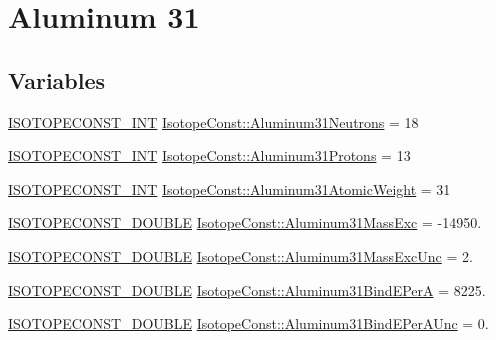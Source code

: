\hypertarget{group___isotope_const-_aluminum-_al31}{}\section{Aluminum 31}
\label{group___isotope_const-_aluminum-_al31}
\subsection*{Variables}
\begin{DoxyCompactItemize}
\item 
\mbox{\hyperlink{group___isotope_const-_macros_ga5f18360b3e99483a35c32d789e62621c}{I\+S\+O\+T\+O\+P\+E\+C\+O\+N\+S\+T\+\_\+\+I\+NT}} \mbox{\hyperlink{group___isotope_const-_aluminum-_al31_ga6e9962d73f31a67100a8aa404f2e4ec9}{Isotope\+Const\+::\+Aluminum31\+Neutrons}} = 18
\item 
\mbox{\hyperlink{group___isotope_const-_macros_ga5f18360b3e99483a35c32d789e62621c}{I\+S\+O\+T\+O\+P\+E\+C\+O\+N\+S\+T\+\_\+\+I\+NT}} \mbox{\hyperlink{group___isotope_const-_aluminum-_al31_ga1ed0e505b7250fbfa53df87f36fa4ebe}{Isotope\+Const\+::\+Aluminum31\+Protons}} = 13
\item 
\mbox{\hyperlink{group___isotope_const-_macros_ga5f18360b3e99483a35c32d789e62621c}{I\+S\+O\+T\+O\+P\+E\+C\+O\+N\+S\+T\+\_\+\+I\+NT}} \mbox{\hyperlink{group___isotope_const-_aluminum-_al31_gab3f313e096d24d246644c6d74b49bdf8}{Isotope\+Const\+::\+Aluminum31\+Atomic\+Weight}} = 31
\item 
\mbox{\hyperlink{group___isotope_const-_macros_ga8f45a7272ce02c0b4c65c44636ed719a}{I\+S\+O\+T\+O\+P\+E\+C\+O\+N\+S\+T\+\_\+\+D\+O\+U\+B\+LE}} \mbox{\hyperlink{group___isotope_const-_aluminum-_al31_ga7560511e2f5bba60ffecc9b698e2791d}{Isotope\+Const\+::\+Aluminum31\+Mass\+Exc}} = -\/14950.
\item 
\mbox{\hyperlink{group___isotope_const-_macros_ga8f45a7272ce02c0b4c65c44636ed719a}{I\+S\+O\+T\+O\+P\+E\+C\+O\+N\+S\+T\+\_\+\+D\+O\+U\+B\+LE}} \mbox{\hyperlink{group___isotope_const-_aluminum-_al31_gaf10f4f255bf390999770b47f554b31aa}{Isotope\+Const\+::\+Aluminum31\+Mass\+Exc\+Unc}} = 2.
\item 
\mbox{\hyperlink{group___isotope_const-_macros_ga8f45a7272ce02c0b4c65c44636ed719a}{I\+S\+O\+T\+O\+P\+E\+C\+O\+N\+S\+T\+\_\+\+D\+O\+U\+B\+LE}} \mbox{\hyperlink{group___isotope_const-_aluminum-_al31_ga52ae54d2aa8de7f99b8d21b291d23f17}{Isotope\+Const\+::\+Aluminum31\+Bind\+E\+PerA}} = 8225.
\item 
\mbox{\hyperlink{group___isotope_const-_macros_ga8f45a7272ce02c0b4c65c44636ed719a}{I\+S\+O\+T\+O\+P\+E\+C\+O\+N\+S\+T\+\_\+\+D\+O\+U\+B\+LE}} \mbox{\hyperlink{group___isotope_const-_aluminum-_al31_ga5d86ce6a9e6ef5373448f3a8d0d1e2d5}{Isotope\+Const\+::\+Aluminum31\+Bind\+E\+Per\+A\+Unc}} = 0.

\end{DoxyCompactItemize}
